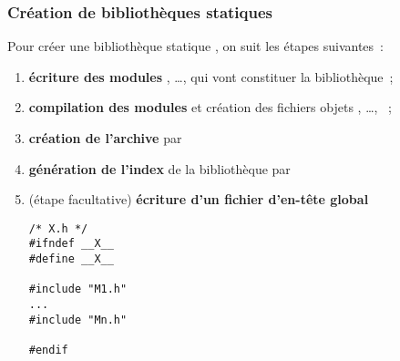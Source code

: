 \begin{frame}[fragile]
\frametitle{Création de bibliothèques statiques}
Pour \alert{créer une bibliothèque statique} , on suit les étapes
suivantes~:
\smallskip

\begin{small}
\begin{enumerate}
    \item {\bf écriture des modules} , \dots,  qui vont
    constituer la bibliothèque~;
    \medskip

    \item {\bf compilation des modules} et création des fichiers objets
    , \dots, ~;
    \medskip

    \item {\bf création de l'archive}  par
    \begin{center}\end{center}
    \medskip

    \item {\bf génération de l'index} de la bibliothèque par
    \begin{center}  \end{center}
    \medskip

    \item (étape facultative) {\bf écriture d'un fichier d'en-tête global}
    \begin{center}
    \begin{minipage}[c]{.3\textwidth}
\begin{lstlisting}[frame=single,numbers=none,basicstyle=\scriptsize\tt]
/* X.h */
#ifndef __X__
#define __X__

#include "M1.h"
...
#include "Mn.h"

#endif
\end{lstlisting}
    \end{minipage}
    \end{center}
\end{enumerate}
\end{small}
\end{frame}



